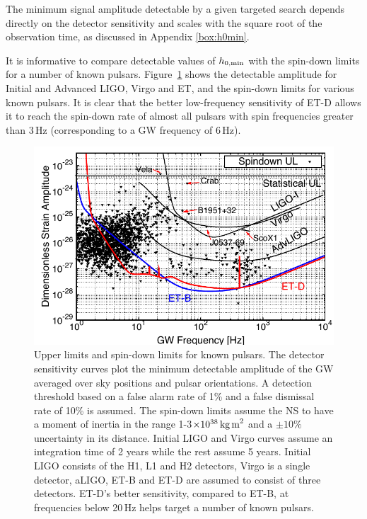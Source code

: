The minimum signal amplitude detectable by a given targeted search depends 
directly on the detector sensitivity and scales with the square root of the observation time, as discussed in Appendix \ref{box:h0min}.  

It is informative to compare detectable values of $h_{0,\rm min}$ with the spin-down
limits for a number of known pulsars.
Figure~\ref{fig-CW-known} shows the detectable amplitude for Initial and
Advanced LIGO, Virgo and ET, and the spin-down limits for various known
pulsars. It is clear that the better low-frequency sensitivity of ET-D allows it to
reach the spin-down rate of almost all pulsars with spin frequencies
greater than 3\,Hz (corresponding to a GW frequency of 6\,Hz).
\begin{figure}
\centering
\includegraphics[angle=0,width=0.65\columnwidth]{./Sec_ET_ScienceCase/TheBigPicture_ETBD_5y.pdf}
\vskip 0.3cm
\caption{
Upper limits and spin-down limits for known pulsars. 
The detector sensitivity curves plot the minimum detectable amplitude 
of the GW averaged over sky positions and pulsar orientations. A detection
threshold based on a false alarm rate of 1\% and a false dismissal rate of 
10\% is assumed.  The spin-down limits assume the NS to have a moment of
inertia in the range 1-3$\times 10^{38}\,\textrm{kg\,m}^2$ and a $\pm
10\%$ uncertainty in its distance.  
Initial LIGO and Virgo curves assume an integration time of 2 years while
the rest assume 5 years.  Initial LIGO consists of the H1, L1 and H2
detectors, Virgo is a single detector, aLIGO, ET-B and
ET-D are assumed to consist of three detectors. ET-D's better
sensitivity, compared to ET-B, at frequencies below 20\,Hz 
helps target a number of known pulsars.}
\label{fig-CW-known}
\end{figure}


